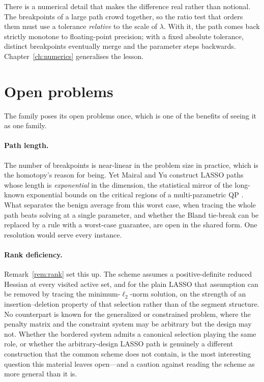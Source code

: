 There is a numerical detail that makes the difference real rather than notional. The
breakpoints of a large path crowd together, so the ratio test that orders them must
use a tolerance \emph{relative} to the scale of $\lambda$. With it, the path comes back
strictly monotone to floating-point precision; with a fixed absolute tolerance,
distinct breakpoints eventually merge and the parameter steps backwards.
Chapter~\ref{ch:numerics} generalises the lesson.

\section{Open problems}

The family poses its open problems once, which is one of the benefits of seeing it as
one family.

\paragraph{Path length.} The number of breakpoints is near-linear in the problem size
in practice, which is the homotopy's reason for being. Yet Mairal and Yu
\cite{mairal2012} construct LASSO paths whose length is \emph{exponential} in the
dimension, the statistical mirror of the long-known exponential bounds on the critical
regions of a multi-parametric QP \cite{tondel2003}. What separates the benign average
from this worst case, when tracing the whole path beats solving at a single parameter,
and whether the Bland tie-break can be replaced by a rule with a worst-case guarantee,
are open in the shared form. One resolution would serve every instance.

\paragraph{Rank deficiency.} Remark~\ref{rem:rank} set this up. The scheme assumes a
positive-definite reduced Hessian at every visited active set, and for the plain LASSO
that assumption can be removed \cite{tibshirani2013} by tracing the
minimum-$\ell_2$-norm solution, on the strength of an insertion--deletion property of
that selection rather than of the segment structure. No counterpart is known for the
generalized or constrained problem, where the penalty matrix and the constraint system
may be arbitrary but the design may not. Whether the bordered system admits a canonical
selection playing the same role, or whether the arbitrary-design LASSO path is
genuinely a different construction that the common scheme does not contain, is the most
interesting question this material leaves open---and a caution against reading the
scheme as more general than it is.

